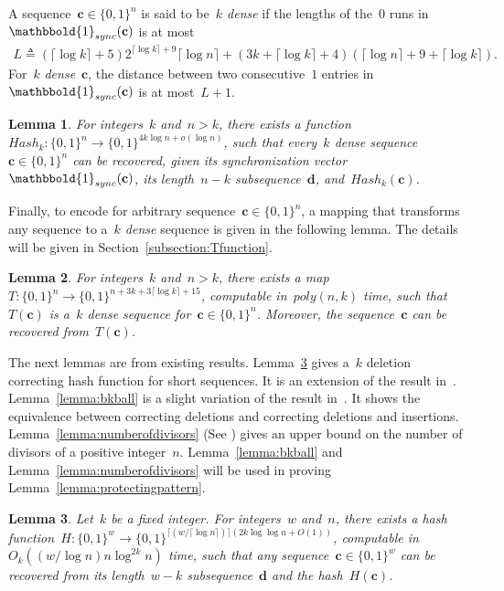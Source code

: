 \documentclass[10pt,a4paper,onecolumn]{IEEEtran}
\newtheorem{lemma}{Lemma}
\newcommand{\1}{\mathbbold{1}}
\newcommand{\boldc}{\mathbf{c}}
\newcommand{\boldd}{\mathbf{d}}
\begin{document}
A sequence~$\boldc\in\{0,1\}^n$ is said to be~\emph{$k$ dense} if the lengths of the~$0$ runs in~$\1_{sync}(\boldc)$ is at most~
\begin{align*}
L\triangleq (\lceil \log k\rceil+5)2^{\lceil \log k\rceil+9}\lceil \log n \rceil
+ (3k+\lceil \log k\rceil+4)(\lceil \log n\rceil +9+\lceil\log k\rceil).
\end{align*}
For~$k$ \emph{dense}~$\boldc$, the distance between two consecutive~$1$ entries in~$\1_{sync}(\boldc)$ is at most~$L+1$.
\begin{lemma}\label{lemma:recoverforkdense}
For integers~$k$ and~$n>k$, there exists a function~$Hash_k:\{0,1\}^n\rightarrow \{0,1\}^{4k\log n+o(\log n)}$, such that every~\emph{$k$ dense} sequence~$\boldc\in\{0,1\}^n$ can be recovered, given its \emph{synchronization vector}~$\1_{sync}(\boldc)$,  its length~$n-k$ subsequence~$\boldd$,  and~$Hash_k(\boldc)$.
\end{lemma}
Finally, to encode for arbitrary sequence~$\boldc\in\{0,1\}^n$, a mapping that transforms any sequence to a~\emph{$k$ dense} sequence is given in the following lemma. The details will be given in Section~\ref{subsection:Tfunction}.
\begin{lemma}\label{lemma:transformation}
For integers~$k$ and~$n>k$, there exists a map
$T:\{0,1\}^n\rightarrow\{0,1\}^{n+3k+3\lceil\log k\rceil+15}$, computable in~$poly(n,k)$ time, such that~$T(\boldc)$ is a~\emph{$k$ dense} sequence for~$\boldc\in\{0,1\}^n$. Moreover, the sequence~$\boldc$ can be recovered from~$T(\boldc)$. 
\end{lemma}
The next lemmas are from existing results. 
Lemma~\ref{lemma:hash} gives a~$k$ deletion correcting hash function for short sequences.
It is an extension of the result in~\cite{brakensiek2016efficient}. 
Lemma~\ref{lemma:bkball} is a slight variation of the result in~\cite{levenshtein1966binary}.  It shows the equivalence between correcting deletions and correcting deletions and insertions.  Lemma~\ref{lemma:numberofdivisors} (See \cite{Nicolas}) gives an upper bound on the number of divisors of a positive integer~$n$. Lemma~\ref{lemma:bkball} and Lemma~\ref{lemma:numberofdivisors} will be used in proving Lemma~\ref{lemma:protectingpattern}.
\begin{lemma}\label{lemma:hash}
Let~$k$ be a fixed integer. For integers~$w$ and~$n$, there exists a hash function~$H:\{0,1\}^w\rightarrow$\newline$ \{0,1\}^{\lceil (w/\lceil \log n \rceil) \rceil (2k\log \log n +O(1))}$, computable in~$O_k((w/ \log n)  n\log^{2k} n )$ time, such that any sequence~$\boldc\in\{0,1\}^w$ can be recovered from its length~$w-k$ subsequence~$\boldd$ and the hash~$H(\boldc)$.
\end{lemma}
\end{document}
